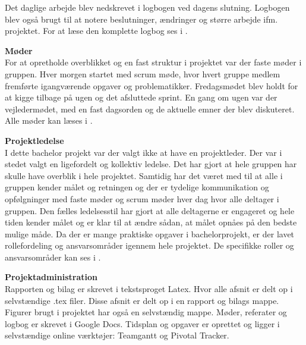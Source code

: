 Det daglige arbejde blev nedskrevet i logbogen ved dagens slutning. Logbogen blev også brugt til at notere beslutninger, ændringer og større arbejde ifm. projektet. For at læse den komplette logbog ses i .

\textbf{Møder}\\
For at opretholde overblikket og en fast struktur i projektet var der faste møder i gruppen. Hver morgen startet med scrum møde, hvor hvert gruppe medlem fremførte igangværende opgaver og problematikker. Fredagsmødet blev holdt for at kigge tilbage på ugen og det afsluttede sprint. En gang om ugen var der vejledermødet, med en fast dagsorden og de aktuelle emner der blev diskuteret. Alle møder kan læses i .

\textbf{Projektledelse}\\
I dette bachelor projekt var der valgt ikke at have en projektleder. Der var i stedet valgt en ligefordelt og kollektiv ledelse. Det har gjort at hele gruppen har skulle have overblik i hele projektet. Samtidig har det været med til at alle i gruppen kender målet og retningen og der er tydelige kommunikation og opfølgninger med faste møder og scrum møder hver dag hvor alle deltager i gruppen. Den fælles ledelsesstil har gjort at alle deltagerne er engageret og hele tiden kender målet og er klar til at ændre sådan, at målet opnåes på den bedste mulige måde. Da der er mange praktiske opgaver i bachelorprojekt, er der lavet rollefordeling og ansvarsområder igennem hele projektet. De specifikke roller og ansvarsområder kan ses i .

\textbf{Projektadministration}\\
Rapporten og bilag er skrevet i tekstsproget Latex. Hvor alle afsnit er delt op i selvstændige .tex filer. Disse afsnit er delt op i en rapport og bilags mappe. Figurer brugt i projektet har også en selvstændig mappe. Møder, referater og logbog er skrevet i Google Docs. Tidsplan og opgaver er oprettet og ligger i selvstændige online værktøjer: Teamgantt og Pivotal Tracker.    

